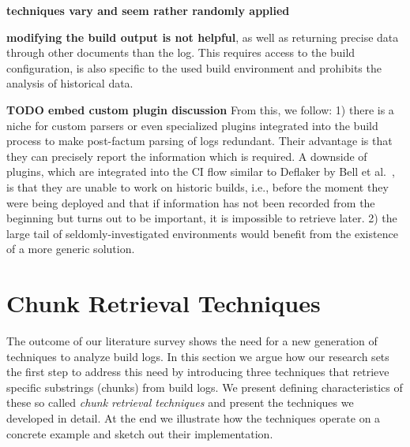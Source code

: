\textbf{techniques vary and seem rather randomly applied}

\textbf{modifying the build output is not helpful}, as well as returning
precise data through other documents than the log.
This requires access to the build configuration, is also specific to
the used build environment and prohibits the analysis of
historical data.

\textbf{TODO embed custom plugin discussion}
From this, we follow: 1) there is a niche for custom parsers or even
specialized plugins integrated into the build process to make
post-factum
parsing of logs redundant. Their advantage is that they can precisely report the information which is required.
A downside of plugins, which are integrated into the CI flow similar to Deflaker by Bell et al.~\cite{bell2018deflaker}, is that they are unable to work on historic
builds, i.e., before the moment they were being deployed and that if information has not been recorded from the beginning but turns out to be important, it is impossible to retrieve later.
2) the large tail of seldomly-investigated environments would benefit
from the existence of a more generic
solution.





\section{Chunk Retrieval Techniques}
\label{sec:techniques}
The outcome of our literature survey shows the need for a new
generation of techniques to analyze build logs.
In this section we argue how our research sets the first step to
address this need by introducing three techniques that retrieve
specific substrings (chunks) from build logs.
We present defining characteristics of these so called \emph{chunk
retrieval techniques} and present the techniques we developed in
detail.
At the end we illustrate how the techniques operate on a concrete
example and sketch out their implementation.

